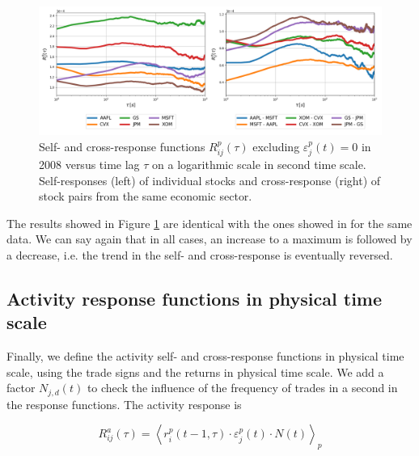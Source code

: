 \begin{figure}[htbp]
    \centering
    \includegraphics[width=\textwidth]
    {figures/03_responses_physical_scale_2008.png}
    \caption{Self- and cross-response functions $R^{p}_{ij}\left(\tau\right)$
             excluding $\varepsilon^{p}_{j}\left(t\right) = 0$ in 2008 versus
             time lag $\tau$ on a logarithmic scale in second time scale.
             Self-responses (left) of individual stocks and cross-response
             (right) of stock pairs from the same economic sector.}
    \label{fig:market_response_time_scale}
\end{figure}

The results showed in Figure \ref{fig:market_response_time_scale} are identical
with the ones showed in \cite{Wang_2016_cross} for the same data. We can say
again that in all cases, an increase to a maximum is followed by a decrease,
i.e. the trend in the self- and cross-response is eventually reversed.

\subsection{Activity response functions in physical time scale}
\label{subsec:activity_response_function}

Finally, we define the activity self- and cross-response functions in physical
time scale, using the trade signs and the returns in physical time scale.
We add a factor $N_{j,d} \left(t \right)$ to check the influence of the
frequency of trades in a second in the response functions. The activity
response is

\begin{equation}\label{eq:activity_response_functions_general}
    R^{a}_{ij}\left(\tau\right)=\left\langle r^{p}_{i}\left(t-1, \tau\right)
    \cdot\varepsilon_{j}^{p} \left(t\right) \cdot N \left(t \right)
    \right\rangle _{p}
\end{equation}

